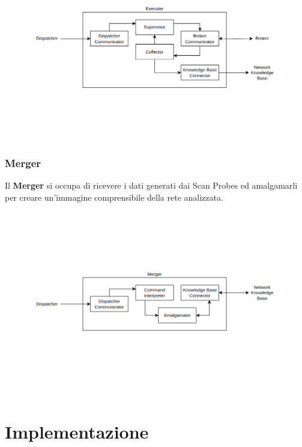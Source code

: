 \documentclass[target=bach,aauheader=,style=]{thud}
\begin{document}
\begin{figure}[h]
  \includegraphics[width=14cm, height=8cm]{executer}
  \centering
\end{figure}

\FloatBarrier

\newpage

\subsection{Merger}
Il \textbf{Merger} si occupa di ricevere i dati generati dai Scan Probes ed amalgamarli per creare un'immagine comprensibile della rete analizzata. 


\begin{figure}[h]
  \includegraphics[width=14cm, height=8cm]{merger}
  \centering
\end{figure}

\FloatBarrier

\chapter{Implementazione}
\end{document}
